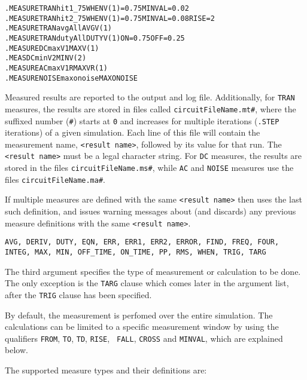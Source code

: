 \begin{Command}
\begin{alltt}
\end{alltt}

\examples
\begin{alltt}
.MEASURE TRAN hit1_75 WHEN V(1)=0.75 MINVAL=0.02
.MEASURE TRAN hit2_75 WHEN V(1)=0.75 MINVAL=0.08 RISE=2
.MEASURE TRAN avgAll AVG V(1)
.MEASURE TRAN dutyAll DUTY V(1) ON=0.75 OFF=0.25
.MEASURE DC maxV1 MAX V(1)
.MEAS DC minV2 MIN V(2)
.MEASURE AC maxV1R MAX VR(1)
.MEASURE NOISE maxonoise MAX ONOISE
\end{alltt}

\arguments

\begin{Arguments}

Measured results are reported to the output and log file.
Additionally, for \texttt{TRAN} measures, the results are stored in
files called \texttt{circuitFileName.mt\#}, where the suffixed number
(\texttt{\#}) starts at \texttt{0} and increases for multiple
iterations (\texttt{.STEP} iterations) of a given simulation. Each
line of this file will contain the measurement name, \texttt{<result
name>}, followed by its value for that run.  The \texttt{<result
name>} must be a legal \Xyce{} character string.  For \texttt{DC} measures,
the results are stored in the files \texttt{circuitFileName.ms\#},
while \texttt{AC} and \texttt{NOISE} measures use the files
\texttt{circuitFileName.ma\#}.

If multiple measures are defined with the same \texttt{<result name>} then
\Xyce{} uses the last such definition, and issues warning messages about
(and discards) any previous measure definitions with the same
\texttt{<result name>}.


\texttt{AVG, DERIV, DUTY, EQN, ERR, ERR1, ERR2, ERROR, FIND, FREQ, FOUR, INTEG, MAX, MIN, OFF\_TIME, ON\_TIME, PP, RMS, WHEN, TRIG, TARG}

The third argument specifies the type of measurement or calculation to
be done. The only exception is the {\tt TARG} clause which comes later
in the argument list, after the {\tt TRIG} clause has been specified.

By default, the measurement is perfomed over the entire simulation.
The calculations can be limited to a specific measurement window by
using the qualifiers {\tt FROM}, {\tt TO}, {\tt TD}, {\tt RISE}, {\tt
FALL}, {\tt CROSS} and {\tt MINVAL}, which are explained below.

The supported measure types and their definitions are:


\end{Arguments}
\end{Command}
